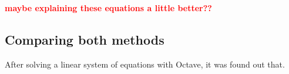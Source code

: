 \par
\textcolor{red}{\textbf{maybe explaining these equations a little better??}}


\subsection{Comparing both methods}
\par
%    
After solving a linear system of equations with Octave, it was found out that. 




